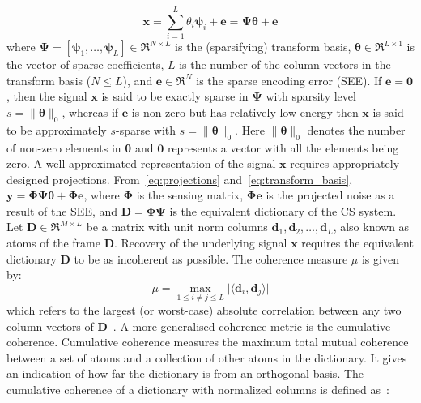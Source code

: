 \begin{equation}
\label{eq:transform_basis}
    \bm{x} = \sum_{i = 1}^{L} \theta_{i} \bm{\psi}_{i} + \bm{e} = \bm{\Psi}\bm{\theta} + \bm{e}
\end{equation}
where $\bm{\Psi} =[\bm{\psi}_1,\dots,\bm{\psi}_L] \in \Re^{N \times L}$ is the (sparsifying) transform basis, $\bm{\theta} \in \Re^{L\times 1}$ is the vector of sparse coefficients, $L$ is the number of the column vectors in the transform basis ($N \leq L$), and $\bm{e} \in \Re^{N}$ is the sparse encoding error (SEE). If $\bm{e} = \bm{0}$, then the signal $\bm{x}$ is said to be exactly sparse in $\bm{\Psi}$ with sparsity level $s=\|\bm{\theta}\|_{0}$, whereas if $\bm{e}$ is non-zero but has relatively low energy then $\bm{x}$ is said to be approximately $s$-sparse with $s=\|\bm{\theta}\|_{0}$. Here $\| \bm{\theta} \|_{0}$ denotes the number of non-zero elements in $\bm{\theta}$ and $\bm{0}$ represents a vector with all the elements being zero.
%
A well-approximated representation of the signal $\bm{x}$ requires appropriately designed projections. From~\eqref{eq:projections} and~\eqref{eq:transform_basis}, $\bm{y}=\bm{\Phi}\bm{\Psi}\bm{\theta} + \bm{\Phi}\bm{e}$, where $\bm{\Phi}$ is the sensing matrix, $\bm{\Phi} \bm{e}$ is the projected noise as a result of the SEE, and $\bm{D} = \bm{\Phi}\bm{\Psi}$ is the equivalent dictionary of the CS system. Let $\bm{D}  \in \Re^{M \times L}$  be a matrix with unit norm columns $\bm{d}_{1}, \bm{d}_{2},\dots,\bm{d}_{L}$, also known as atoms of the frame $\bm{D}$. Recovery of the underlying signal $\bm{x}$ requires the equivalent dictionary $\bm{D}$ to be as incoherent as possible. The coherence measure $\mu$ is given by:
\begin{equation}
    \label{eq: mu_for_frame}
    \mu = \underset{1 \leq i\neq j \leq L}{\max}\lvert\langle \bm{d}_{i}, \bm{d}_{j}\rangle\rvert
\end{equation}
which refers to the largest (or worst-case) absolute correlation between any two column vectors of $\bm{D}$~\cite{Sparse_union_bases,Donoho_optimal_sparse,Candes_CS}. A more generalised coherence metric is the cumulative coherence. Cumulative coherence measures the maximum total mutual coherence between a set of atoms and a collection of other atoms in the dictionary. It gives an indication of how far the dictionary is from an orthogonal basis. The cumulative coherence of a dictionary with normalized columns is defined as~\cite{Greed, BO_LI, shrinkage_sensing}:
